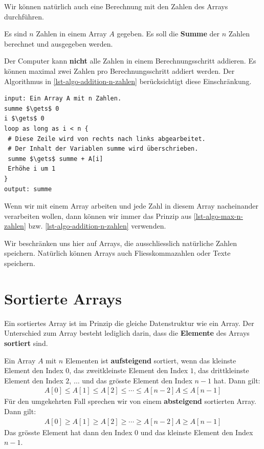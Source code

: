 Wir können natürlich auch eine Berechnung mit den Zahlen des Arrays durchführen.

\begin{problem}\label{problem-addition-n-zahlen}
	Es sind $n$ Zahlen in einem Array $A$ gegeben. Es soll die \textbf{Summe} der $n$ Zahlen berechnet und ausgegeben werden.
\end{problem}

Der Computer kann \textbf{nicht} alle Zahlen in einem Berechnungsschritt addieren. Es können maximal zwei Zahlen pro Berechnungsschritt addiert werden. Der Algorithmus in \autoref{lst-algo-addition-n-zahlen} berücksichtigt diese Einschränkung.

\begin{lstlisting}[language=pseudocode, caption={Wir verwenden die Variable \lstinline{summe}, um die Zahlen fortlaufend zu addieren.}, label={lst-algo-addition-n-zahlen}]
input: Ein Array A mit n Zahlen.
summe $\gets$ 0
i $\gets$ 0
loop as long as i < n {
 # Diese Zeile wird von rechts nach links abgearbeitet.
 # Der Inhalt der Variablen summe wird überschrieben.
 summe $\gets$ summe + A[i]
 Erhöhe i um 1
}
output: summe
\end{lstlisting}

Wenn wir mit einem Array arbeiten und jede Zahl in diesem Array nacheinander verarbeiten wollen, dann können wir immer das Prinzip aus \autoref{lst-algo-max-n-zahlen} bzw. \autoref{lst-algo-addition-n-zahlen} verwenden.

\begin{hinweis}
Wir beschränken uns hier auf Arrays, die ausschliesslich natürliche Zahlen speichern. Natürlich können Arrays auch Fliesskommazahlen oder Texte speichern.
\end{hinweis}

\section{Sortierte Arrays}

Ein sortiertes Array ist im Prinzip die gleiche Datenstruktur wie ein Array. Der Unterschied zum Array besteht lediglich darin, dass die \textbf{Elemente} des Arrays \textbf{sortiert} sind.

\begin{definition}
Ein Array $A$ mit $n$ Elementen ist \textbf{aufsteigend} sortiert, wenn das kleinste Element den Index $0$, das zweitkleinste Element den Index $1$, das drittkleinste Element den Index $2$, $\dots$ und das grösste Element den Index $n-1$ hat. Dann gilt: 
\begin{align*}
A[0] \leq A[1] \leq A[2] \leq \cdots \leq A[n - 2] A\leq A[n - 1]
\end{align*}
Für den umgekehrten Fall sprechen wir von einem \textbf{absteigend} sortierten Array. Dann gilt:
\begin{align*}
A[0] \geq A[1] \geq A[2] \geq \cdots \geq A[n - 2] A\geq A[n - 1]
\end{align*}
Das grösste Element hat dann den Index $0$ und das kleinste Element den Index $n-1$.
\end{definition}

